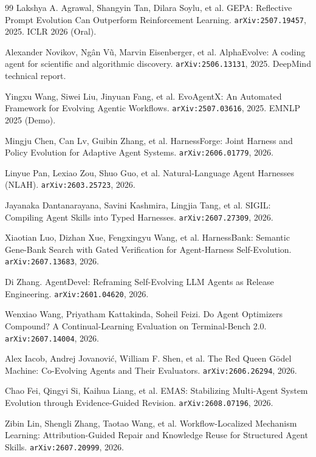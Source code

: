\begin{thebibliography}{99}
 Lakshya A. Agrawal, Shangyin Tan, Dilara Soylu, et al.
  GEPA: Reflective Prompt Evolution Can Outperform Reinforcement Learning.
  \texttt{arXiv:2507.19457}, 2025. ICLR 2026 (Oral).

 Alexander Novikov, Ng\^{a}n V\~{u}, Marvin
  Eisenberger, et al. AlphaEvolve: A coding agent for scientific and
  algorithmic discovery. \texttt{arXiv:2506.13131}, 2025. DeepMind
  technical report.

 Yingxu Wang, Siwei Liu, Jinyuan Fang, et al.
  EvoAgentX: An Automated Framework for Evolving Agentic Workflows.
  \texttt{arXiv:2507.03616}, 2025. EMNLP 2025 (Demo).

 Mingju Chen, Can Lv, Guibin Zhang, et al.
  HarnessForge: Joint Harness and Policy Evolution for Adaptive Agent
  Systems. \texttt{arXiv:2606.01779}, 2026.

 Linyue Pan, Lexiao Zou, Shuo Guo, et al. Natural-Language
  Agent Harnesses (NLAH). \texttt{arXiv:2603.25723}, 2026.

 Jayanaka Dantanarayana, Savini Kashmira, Lingjia Tang, et
  al. SIGIL: Compiling Agent Skills into Typed Harnesses.
  \texttt{arXiv:2607.27309}, 2026.

 Xiaotian Luo, Dizhan Xue, Fengxingyu Wang, et al.
  HarnessBank: Semantic Gene-Bank Search with Gated Verification for
  Agent-Harness Self-Evolution. \texttt{arXiv:2607.13683}, 2026.

 Di Zhang. AgentDevel: Reframing Self-Evolving LLM
  Agents as Release Engineering. \texttt{arXiv:2601.04620}, 2026.

 Wenxiao Wang, Priyatham Kattakinda, Soheil Feizi. Do
  Agent Optimizers Compound? A Continual-Learning Evaluation on
  Terminal-Bench 2.0. \texttt{arXiv:2607.14004}, 2026.

 Alex Iacob, Andrej Jovanovi\'{c}, William F. Shen, et
  al. The Red Queen G\"odel Machine: Co-Evolving Agents and Their
  Evaluators. \texttt{arXiv:2606.26294}, 2026.

 Chao Fei, Qingyi Si, Kaihua Liang, et al. EMAS:
  Stabilizing Multi-Agent System Evolution through Evidence-Guided
  Revision. \texttt{arXiv:2608.07196}, 2026.

 Zibin Lin, Shengli Zhang, Taotao Wang, et al.
  Workflow-Localized Mechanism Learning: Attribution-Guided Repair and
  Knowledge Reuse for Structured Agent Skills. \texttt{arXiv:2607.20999},
  2026.


\end{thebibliography}
